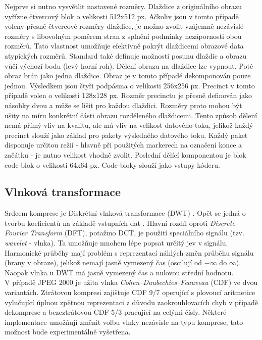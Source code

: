 \noindent Nejprve si nutno vysvětlit nastavené rozměry. Dlaždice z originálního obrazu vyřízne čtvercový blok o velikosti 512x512 px. Ačkoliv jsou v tomto případě voleny přesně čtvercové rozměry dlaždice, je možno zvolit vzájemně nezávislé rozměry s libovolným poměrem stran z splnění podmínky nezápornosti obou rozměrů. Tato vlastnost umožňuje efektivně pokrýt dlaždicemi obrazové data atypických rozměrů. Standard také definuje možnosti posunu dlaždic a obrazu vůči výchozí bodu (levý horní roh). Dělení obrazu na dlaždice lze vypnout. Poté obraz brán jako jedna dlaždice. Obraz je v tomto případě dekomponován pouze jednou. Výsledkem jsou čtyři podpásma o velikosti 256x256 px. Precinct v tomto případě volen o velikosti 128x128 px. Rozměr precinctu je přesně definován jako násobky dvou a může se lišit pro každou dlaždici. Rozměry proto mohou být ušity na míru konkrétní části obrazu rozděleného dlaždicemi. Tento způsob dělení nemá přímý vliv na kvalitu, ale má vliv na velikost datového toku, jelikož každý precinct slouží jako základ pro pakety výsledného datového toku. Každý paket disponuje určitou režií - hlavně při použitých markerech na označení konce a začátku - je nutno velikost vhodně zvolit. Poslední dělící komponentou je blok code-blok o velikosti 64x64 px. Code-bloky slouží jako vstupy kóderu.


\subsection*{Vlnková transformace}
Srdcem komprese je Diskrétní vlnková transformace (DWT) \cite{vlnkova}. Opět se jedná o tvorbu koeficientů na základě vstupních dat \cite{intro}. Hlavní rozdíl oproti \textit{Discrete Fourier Transform} (DFT), potažmo DCT, je použití speciálního signálu (tzv. \textit{wavelet} - vlnka). Ta umožňuje mnohem lépe popsat určitý jev v signálu. Harmonické průběhy mají problém s reprezentací náhlých změn průběhu signálu (hrany v obraze), jelikož nemají jasně vymezený čas (oscilují od $-\infty$ do $\infty$). Naopak vlnka u DWT má jasně vymezený čas a nulovou střední hodnotu.\\
V případě JPEG 2000 je užita vlnka \textit{Cohen–Daubechies–Feauveau} (CDF) ve dvou variantách. Ztrátovou kompresi zajištuje CDF 9/7 operující s plovoucí aritmetice vylučující úplnou zpětnou reprezentaci z důvodu zaokrouhlovacích chyb v případě dekomprese a bezeztrátovou CDF 5/3 pracující na celými čísly. Některé implementace umožňují změnit volbu vlnky nezávisle na typu komprese; tato možnost bude experimentálně vyšetřena. 

